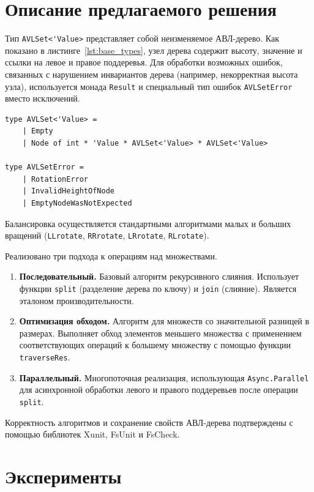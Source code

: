 \documentclass[a4paper,12pt]{article}
\begin{document}
\section{Описание предлагаемого решения}

Тип \verb|AVLSet<'Value>| представляет собой неизменяемое АВЛ-дерево. Как показано в листинге~\ref{lst:base_types}, узел дерева содержит высоту, значение и ссылки на левое и правое поддеревья. Для обработки возможных ошибок, связанных с нарушением инвариантов дерева (например, некорректная высота узла), используется монада \verb|Result| и специальный тип ошибок \verb|AVLSetError| вместо исключений.

\begin{lstlisting}[caption={Определение базовых типов}, label={lst:base_types}]
type AVLSet<'Value> =
    | Empty
    | Node of int * 'Value * AVLSet<'Value> * AVLSet<'Value>

type AVLSetError =
    | RotationError
    | InvalidHeightOfNode
    | EmptyNodeWasNotExpected
\end{lstlisting}

Балансировка осуществляется стандартными алгоритмами малых и больших вращений (\verb|LLrotate|, \verb|RRrotate|, \verb|LRrotate|, \verb|RLrotate|). 

Реализовано три подхода к операциям над множествами.

\begin{enumerate}
    \item \textbf{Последовательный.} Базовый алгоритм рекурсивного слияния. Использует функции \verb|split| (разделение дерева по ключу) и \verb|join| (слияние). Является эталоном производительности.
    
    \item \textbf{Оптимизация обходом.} Алгоритм для множеств со значительной разницей в размерах. Выполняет обход элементов меньшего множества с применением соответствующих операций к большему множеству с помощью функции \verb|traverseRes|.

    \item \textbf{Параллельный.} Многопоточная реализация, использующая \verb|Async.Parallel| для асинхронной обработки левого и правого поддеревьев после операции \verb|split|.
\end{enumerate}

Корректность алгоритмов и сохранение свойств АВЛ-дерева подтверждены с помощью библиотек Xunit, FsUnit и FsCheck.

\section{Эксперименты}
\end{document}
